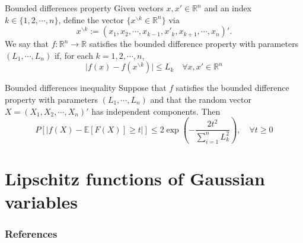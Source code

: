 \documentclass[10pt,handout,english]{beamer}
\newcommand{\E}{\mathbb{E}}
\newcommand{\R}{\mathbb{R}}
\begin{document}
\begin{frame}
\begin{block}{Bounded differences property}
Given vectors $x,x'\in\R^n$ and an index $k\in\{1,2,\cdots,n\}$, define the vector $\{x^{\backslash k}\in\R^n\}$ via
\[
x^{\backslash k}:=(x_1,x_2,\cdots,x_{k-1},x'_k,x_{k+1},\cdots,x_n)'.
\]
We say that $f:\R^n\to\R$ satisfies the bounded difference property with parameters $(L_1,\cdots,L_n)$ if, for each $k=1,2,\cdots,n$,
\[
\lvert f(x)-f(x^{\backslash k})\rvert\leq L_k\quad \forall x,x'\in\R^n
\]
\end{block}
\end{frame}
\begin{frame}
\begin{block}{Bounded differences inequality}
Suppose that $f$ satisfies the bounded difference property with parameters $(L_1,\cdots,L_n)$ and that the random vector $X=(X_1,X_2,\cdots,X_n)'$ has independent components. Then
\[
P[\lvert f(X)-\E[F(X)]\geq t\rvert]\leq 2\exp\left(-\frac{2t^2}{\sum_{i=1}^{n}L_k^2}\right),\quad \forall t\geq 0
\]
\end{block}
\end{frame}
\section{Lipschitz functions of Gaussian variables}
\frame{\tableofcontents[currentsection]}





\begin{frame}[allowframebreaks]
\frametitle{References}


\end{frame}
\end{document}
